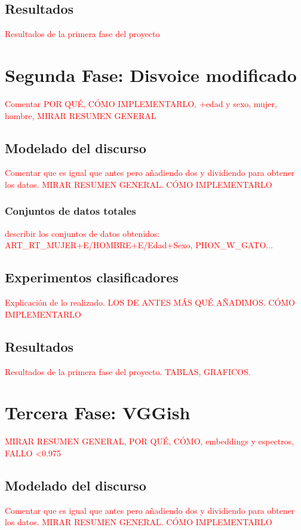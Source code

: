 \subsection{Resultados}
\textcolor{red}{Resultados de la primera fase del proyecto}


\section{Segunda Fase: Disvoice modificado}
\textcolor{red}{Comentar POR QUÉ, CÓMO IMPLEMENTARLO, +edad y sexo, mujer, hombre, MIRAR RESUMEN GENERAL}

\subsection{Modelado del discurso}
\textcolor{red}{Comentar que es igual que antes pero añadiendo dos y dividiendo para obtener los datos. MIRAR RESUMEN GENERAL. CÓMO IMPLEMENTARLO}

\subsubsection{Conjuntos de datos totales}
\textcolor{red}{describir los conjuntos de datos obtenidos: ART\_RT\_MUJER+E/HOMBRE+E/Edad+Sexo, PHON\_W\_GATO...}

\subsection{Experimentos clasificadores}
\textcolor{red}{Explicación de lo realizado. LOS DE ANTES MÁS QUÉ AÑADIMOS. CÓMO IMPLEMENTARLO}

\subsection{Resultados}
\textcolor{red}{Resultados de la primera fase del proyecto. TABLAS, GRAFICOS.}


\section{Tercera Fase: VGGish}
\textcolor{red}{MIRAR RESUMEN GENERAL, POR QUÉ, CÓMO, embeddings y espectros, FALLO <0.975}

\subsection{Modelado del discurso}
\textcolor{red}{Comentar que es igual que antes pero añadiendo dos y dividiendo para obtener los datos. MIRAR RESUMEN GENERAL. CÓMO IMPLEMENTARLO}

